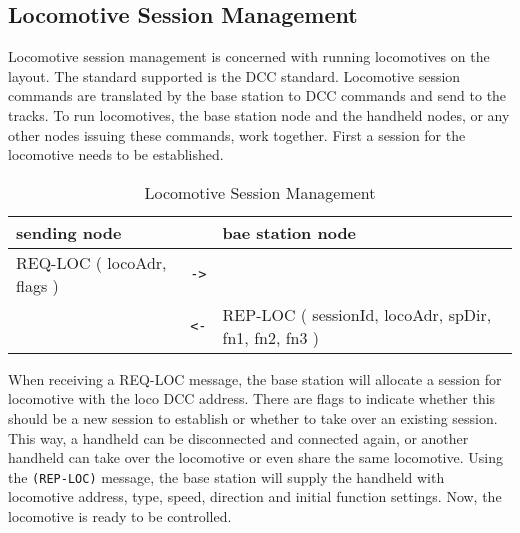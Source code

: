 \subsection{Locomotive Session Management}

Locomotive session management is concerned with running locomotives on the layout. The standard supported is the DCC standard. Locomotive session commands are translated by the base station to DCC commands and send to the tracks. To run locomotives, the base station node and the handheld nodes, or any other nodes issuing these commands,  work together. First a session for the locomotive needs to be established.

\begin{table}[ht!]
    \begin{center}
        \caption{Locomotive Session Management}
        \begin{tabular}{|p{}| c |p{}|}
            \toprule
            \textbf{sending node} & & \textbf{ bae station node} \\
            \midrule
            REQ-LOC ( locoAdr, flags ) & \texttt{->} &  \\
            \midrule
            & \texttt{<-} & REP-LOC ( sessionId, locoAdr, spDir, fn1, fn2, fn3 ) \\
            \bottomrule
        \end{tabular}
    \end{center}
\end{table}

When receiving a REQ-LOC message, the base station will allocate a session for locomotive with the loco DCC address. There are flags to indicate whether this should be a new session to establish or whether to take over an existing session. This way, a handheld can be disconnected and connected again, or another handheld can take over the locomotive or even share the same locomotive. Using the \texttt{(REP-LOC)} message, the base station will supply the handheld with locomotive address, type, speed, direction and initial function settings. Now, the locomotive is ready to be controlled.

